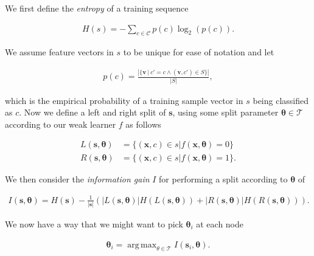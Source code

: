 \documentclass[12pt,twoside,notitlepage]{report}
\newcommand{\vc}[1]{\mathbf{#1}}
\newcommand{\cl}[1]{\mathcal{#1}}
\DeclareMathOperator*{\argmax}{arg\,max}
\begin{document}
            We first define the \textit{entropy} of a training sequence

            \begin{align}
                H(s) = - \sum_{c\in\cl{C}} p(c) \log_2 (p(c)).
                \label{eq:training_seq_entropy}
            \end{align}

            We assume feature vectors in $s$ to be unique for ease of notation and let

            \begin{align}
                p(c) = \frac{\left| \{\vc{v}\ |\ c' = c \land (\vc{v},c') \in S \} \right|}{\left| S \right|},
                \label{eq:empirical_distribution}
            \end{align}
            
            which is the empirical probability of a training sample vector in $s$ being classified as $c$. Now we define 
            a left and right split of $\vc{s}$, using some split parameter $\vc{\theta} \in \cl{T}$ according to our weak 
            learner $f$ as follows

            \begin{align}
                L(\vc{s},\vc{\theta}) & = \{ (\vc{x}, c) \in s | f(\vc{x}, \vc{\theta}) = 0 \}  \label{eq:left_split}\\
                R(\vc{s},\vc{\theta}) & = \{ (\vc{x}, c) \in s | f(\vc{x}, \vc{\theta}) = 1 \}. \label{eq:right_split}
            \end{align}

            We then consider the \textit{information gain} $I$ for performing a split according to $\vc{\theta}$ of 

            \begin{align}
                I(\vc{s}, \vc{\theta}) = H(\vc{s}) - \frac{1}{|\vc{s}|} \left( |L(\vc{s}, \vc{\theta})| H(L(\vc{s}, \vc{\theta})) 
                                                                          + |R(\vc{s}, \vc{\theta})| H(R(\vc{s}, \vc{\theta})) \right).
                \label{eq:information_gain}
            \end{align} 

            We now have a way that we might want to pick $\vc{\theta}_i$ at each node

            \begin{align} 
                \vc{\theta}_i = \argmax_{\theta\in\cl{T}} I(\vc{s}_i, \vc{\theta}).
            \end{align} 
\end{document}
